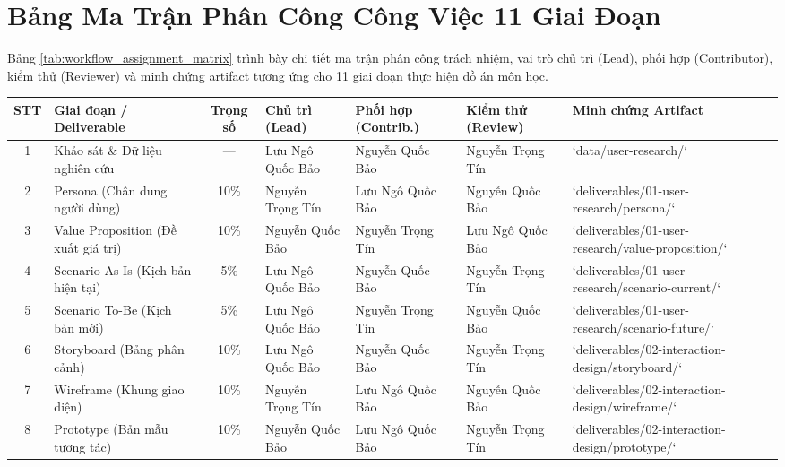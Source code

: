 \newpage
\appendix
\section{Bảng Ma Trận Phân Công Công Việc 11 Giai Đoạn}

Bảng \ref{tab:workflow_assignment_matrix} trình bày chi tiết ma trận phân công trách nhiệm, vai trò chủ trì (Lead), phối hợp (Contributor), kiểm thử (Reviewer) và minh chứng artifact tương ứng cho 11 giai đoạn thực hiện đồ án môn học.

\begin{table}[H]
  \centering
  \scriptsize
  \renewcommand{\arraystretch}{1.15}
  \begin{tabularx}{\textwidth}{|c|X|c|m{2.2cm}|m{2.2cm}|m{2.2cm}|m{2.6cm}|}
    \hline
    \textbf{STT} & \textbf{Giai đoạn / Deliverable} & \textbf{Trọng số} & \textbf{Chủ trì (Lead)} & \textbf{Phối hợp (Contrib.)} & \textbf{Kiểm thử (Review)} & \textbf{Minh chứng Artifact} \\ \hline
    1 & Khảo sát \& Dữ liệu nghiên cứu & --- & Lưu Ngô Quốc Bảo & Nguyễn Quốc Bảo & Nguyễn Trọng Tín & `data/user-research/` \\ \hline
    2 & Persona (Chân dung người dùng) & 10\% & Nguyễn Trọng Tín & Lưu Ngô Quốc Bảo & Nguyễn Quốc Bảo & `deliverables/01-user-research/persona/` \\ \hline
    3 & Value Proposition (Đề xuất giá trị) & 10\% & Nguyễn Quốc Bảo & Nguyễn Trọng Tín & Lưu Ngô Quốc Bảo & `deliverables/01-user-research/value-proposition/` \\ \hline
    4 & Scenario As-Is (Kịch bản hiện tại) & 5\% & Lưu Ngô Quốc Bảo & Nguyễn Quốc Bảo & Nguyễn Trọng Tín & `deliverables/01-user-research/scenario-current/` \\ \hline
    5 & Scenario To-Be (Kịch bản mới) & 5\% & Lưu Ngô Quốc Bảo & Nguyễn Trọng Tín & Nguyễn Quốc Bảo & `deliverables/01-user-research/scenario-future/` \\ \hline
    6 & Storyboard (Bảng phân cảnh) & 10\% & Lưu Ngô Quốc Bảo & Nguyễn Quốc Bảo & Nguyễn Trọng Tín & `deliverables/02-interaction-design/storyboard/` \\ \hline
    7 & Wireframe (Khung giao diện) & 10\% & Nguyễn Trọng Tín & Lưu Ngô Quốc Bảo & Nguyễn Quốc Bảo & `deliverables/02-interaction-design/wireframe/` \\ \hline
    8 & Prototype (Bản mẫu tương tác) & 10\% & Nguyễn Quốc Bảo & Lưu Ngô Quốc Bảo & Nguyễn Trọng Tín & `deliverables/02-interaction-design/prototype/` \\ \hline

\end{tabularx}
\end{table}
